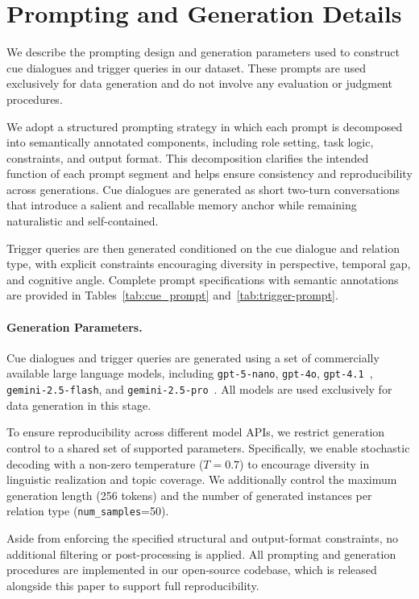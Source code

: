 \documentclass[11pt]{article}
\begin{document}
\clearpage

\appendix

\section{Prompting and Generation Details}
\label{app:benchmark_details}

We describe the prompting design and generation parameters used to
construct cue dialogues and trigger queries in our dataset.
These prompts are used exclusively for data generation and do not involve
any evaluation or judgment procedures.

We adopt a structured prompting strategy in which each prompt is
decomposed into semantically annotated components, including role setting,
task logic, constraints, and output format.
This decomposition clarifies the intended function of each prompt segment
and helps ensure consistency and reproducibility across generations.
Cue dialogues are generated as short two-turn conversations that introduce
a salient and recallable memory anchor while remaining naturalistic and
self-contained.


Trigger queries are then generated conditioned on the cue dialogue and
relation type, with explicit constraints encouraging diversity in
perspective, temporal gap, and cognitive angle.
Complete prompt specifications with semantic annotations are provided in
Tables~\ref{tab:cue_prompt} and~\ref{tab:trigger-prompt}.

\paragraph{Generation Parameters.}
Cue dialogues and trigger queries are generated using a set of
commercially available large language models,
including \texttt{gpt-5-nano}, \texttt{gpt-4o}, \texttt{gpt-4.1}~\cite{achiam2023gpt},
\texttt{gemini-2.5-flash}, and \texttt{gemini-2.5-pro}~\cite{team2023gemini}.
All models are used exclusively for data generation in this stage.

To ensure reproducibility across different model APIs, we restrict
generation control to a shared set of supported parameters.
Specifically, we enable stochastic decoding with a non-zero temperature
($T=0.7$) to encourage diversity in linguistic realization and topic
coverage.
We additionally control the maximum generation length (256 tokens) and
the number of generated instances per relation type
(\texttt{num\_samples}=50).

Aside from enforcing the specified structural and output-format
constraints, no additional filtering or post-processing is applied.
All prompting and generation procedures are implemented in our open-source
codebase, which is released alongside this paper to support full
reproducibility.
\end{document}
